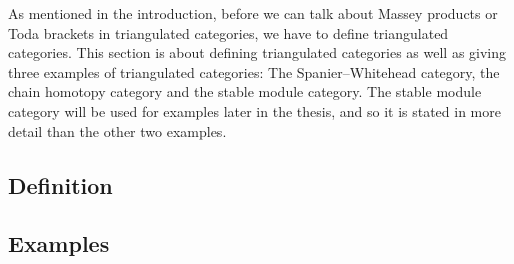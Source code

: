 As mentioned in the introduction, before we can talk about Massey products or Toda brackets in triangulated categories, we have to define triangulated categories. This section is about defining triangulated categories as well as giving three examples of triangulated categories: The Spanier--Whitehead category, the chain homotopy category and the stable module category. The stable module category will be used for examples later in the thesis, and so it is stated in more detail than the other two examples.

\subsection{Definition}


\subsection{Examples}
